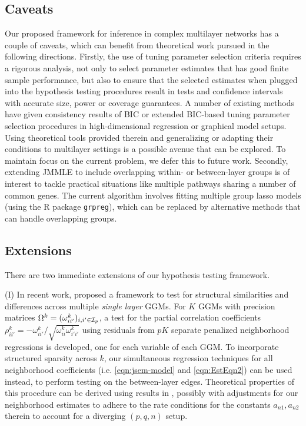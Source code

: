 {\colb
\subsection{Caveats}
Our proposed framework for inference in complex multilayer networks has a couple of caveats, which can benefit from theoretical work pursued in the following directions. Firstly, the use of tuning parameter selection criteria requires a rigorous analysis, not only to select parameter estimates that has good finite sample performance, but also to ensure that the selected estimates when plugged into the hypothesis testing procedures result in tests and confidence intervals with accurate size, power or coverage guarantees. A number of existing methods have given consistency results of BIC or extended BIC-based tuning parameter selection procedures in high-dimensional regression \citep{FanTang13, WangKimLi13} or graphical model \citep{FoygelDrton10,GaoEtal12} setups. Using theoretical tools provided therein and generalizing or adapting their conditions to multilayer settings is a possible avenue that can be explored. To maintain focus on the current problem, we defer this to future work. Secondly, extending JMMLE to include overlapping within- or between-layer groups is of interest to tackle practical situations like multiple pathways sharing a number of common genes. The current algorithm involves fitting multiple group lasso models (using the R package \texttt{grpreg}), which can be replaced by alternative methods that can handle overlapping groups.
}

\subsection{Extensions}
There are two immediate extensions of our hypothesis testing framework.

\vspace{1em}
\noindent (I) In recent work, \citet{Liu17} proposed a framework to test for structural similarities and differences across multiple {\it single layer} GGMs. For $K$ GGMs with precision matrices $\Omega^k = (\omega_{ii'}^k)_{i,i' \in {\cal{I}}_p}$, a test for the partial correlation coefficients $\rho_{ii'}^{k} = - \omega_{ii'}^{k} / \sqrt{\omega_{ii}^{k} \omega_{i'i'}^{k}}$ using residuals from $pK$ separate penalized neighborhood regressions is developed, one for each variable of each GGM. To incorporate structured sparsity across $k$, our simultaneous regression techniques for all neighborhood coefficients (i.e. \eqref{eqn:jsem-model} and \eqref{eqn:EstEqn2}) can be used instead, to perform testing on the between-layer edges. Theoretical properties of this procedure can be derived using results in \citet{Liu17}, possibly with adjustments for our neighborhood estimates to adhere to the rate conditions for the constants $a_{n1}, a_{n2}$ therein to account for a diverging $(p,q,n)$ setup.

